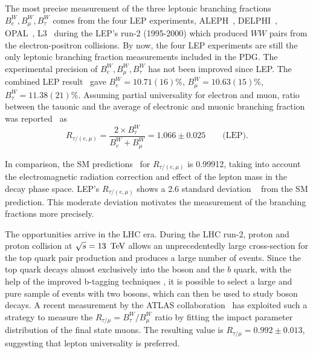 The most precise measurement of the three \PW leptonic branching fractions $B^W_e, B^W_\mu, B^W_\tau$ comes from the four LEP experiments, ALEPH~\cite{Heister:2004wr}, DELPHI~\cite{Abdallah:2003zm}, OPAL~\cite{Abbiendi:2007rs}, L3~\cite{Achard:2004zw} during the LEP's run-2 (1995-2000) which produced $WW$ pairs from the electron-positron collisions. By now, the four LEP experiments are still the only \PW leptonic branching fraction measurements included in the PDG. The experimental precision of $B^W_e, B^W_\mu, B^W_\tau$ has not been improved since LEP. The combined LEP result~\cite{Schael:2013ita} gave $B^W_e = 10.71(16)\%$, $B^W_\mu = 10.63(15)\%$, $B^W_\tau = 11.38(21)\%$. Assuming partial universality for electron and muon, ratio between the tauonic and the average of electronic and muonic branching fraction was reported~\cite{Schael:2013ita} as
\begin{equation*}
    R_{\tau/(e,\mu)} = \frac{2\times B^W_\tau }{B^W_e +  B^W_\mu} = 1.066 \pm 0.025 \qquad \text{(LEP)}.
\end{equation*}

\noindent In comparison, the SM predictions~\cite{Denner:1991kt,Rtau,dEnterria:2016rbf} for $R_{\tau/(e,\mu)}$ is 0.99912,  
taking into account the electromagnetic radiation correction and effect of the lepton mass in the \PW decay phase space. LEP's $R_{\tau/(e,\mu)}$ shows a 2.6 standard deviation ~\cite{Schael:2013ita} from the SM prediction. This moderate deviation motivates the measurement of the branching fractions more precisely.





The opportunities arrive in the LHC era. During the LHC run-2, proton and proton collision at $\sqrt{s}=13~\,\text{Te\hspace{-.08em}V}$ allows an unprecedentedly large cross-section for the top quark pair production and produces a large number of \ttbar events. Since the top quark decays almost exclusively into the \PW boson and the $b$ quark, with the help of the improved b-tagging techniques \cite{Chatrchyan:2012jua, Sirunyan:2017ezt, Bols:2020bkb}, it is possible to select a large and pure sample of \ttbar events with two \PW bosons, which can then be used to study \PW boson decays. A recent measurement by the ATLAS collaboration~\cite{Aad:2020ayz} has exploited such a strategy to measure the $R_{\tau/\mu}=B^W_\tau/B^W_\mu$ ratio by fitting the impact parameter distribution of the final state muons. The resulting value is $R_{\tau/\mu} = 0.992 \pm 0.013$, suggesting that lepton universality is preferred. 


